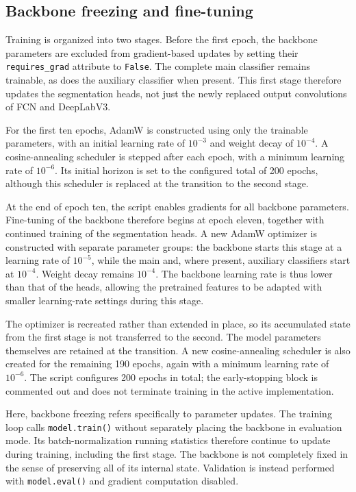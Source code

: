 \subsection{Backbone freezing and fine-tuning}
\label{subsec:c3_fine_tuning}

Training is organized into two stages. Before the first epoch, the
backbone parameters are excluded from gradient-based updates by setting
their \texttt{requires\_grad} attribute to \texttt{False}. The complete
main classifier remains trainable, as does the auxiliary classifier when
present. This first stage therefore updates the segmentation heads,
not just the newly replaced output convolutions of FCN and DeepLabV3.

For the first ten epochs, AdamW is constructed using only the trainable
parameters, with an initial learning rate of $10^{-3}$ and weight decay
of $10^{-4}$. A cosine-annealing scheduler is stepped after each epoch,
with a minimum learning rate of $10^{-6}$. Its initial horizon is set to
the configured total of 200 epochs, although this scheduler is replaced
at the transition to the second stage.

At the end of epoch ten, the script enables gradients for all backbone
parameters. Fine-tuning of the backbone therefore begins at epoch eleven,
together with continued training of the segmentation heads. A new AdamW
optimizer is constructed with separate parameter groups: the backbone
starts this stage at a learning rate of $10^{-5}$, while the main and,
where present, auxiliary classifiers start at $10^{-4}$. Weight decay
remains $10^{-4}$. The backbone learning rate is thus lower than that of
the heads, allowing the pretrained features to be adapted with smaller
learning-rate settings during this stage.

The optimizer is recreated rather than extended in place, so its
accumulated state from the first stage is not transferred to the second.
The model parameters themselves are retained at the transition. A new
cosine-annealing scheduler is also created for the remaining 190 epochs,
again with a minimum learning rate of $10^{-6}$. The script configures
200 epochs in total; the early-stopping block is commented out and does
not terminate training in the active implementation.

Here, backbone freezing refers specifically to parameter updates. The
training loop calls \texttt{model.train()} without separately placing the
backbone in evaluation mode. Its batch-normalization running statistics
therefore continue to update during training, including the first stage.
The backbone is not completely fixed in the sense of preserving all of
its internal state. Validation is instead performed with
\texttt{model.eval()} and gradient computation disabled.

